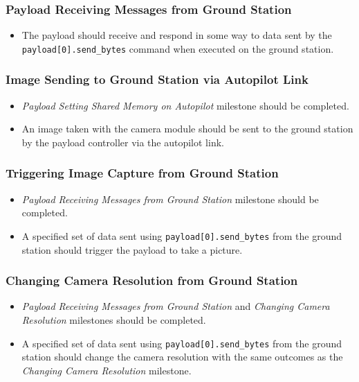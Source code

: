 	\subsubsection{Payload Receiving Messages from Ground Station}
		\begin{itemize}
			\item 	The payload should receive and respond in some way to 
				data sent by the \verb+payload[0].send_bytes+ command
				when executed on the ground station.
		\end{itemize}

	\subsubsection{Image Sending to Ground Station via Autopilot Link}
		\begin{itemize}
			\item 	\emph{Payload Setting Shared Memory on Autopilot} milestone
				should be completed.
			\item 	An image taken with the camera module should be sent to the
				ground station by the payload controller via the autopilot link.
		\end{itemize}


	\subsubsection{Triggering Image Capture from Ground Station}
		\begin{itemize}
			\item 	\emph{Payload Receiving Messages from Ground Station} milestone
				should be completed.
			\item 	A specified set of data sent using \verb+payload[0].send_bytes+
				from the ground station should trigger the payload to take a picture.
		\end{itemize}

	\subsubsection{Changing Camera Resolution from Ground Station}
		\begin{itemize}
			\item 	\emph{Payload Receiving Messages from Ground Station} and 
				\emph{Changing Camera Resolution} milestones should be completed.
			\item 	A specified set of data sent using \verb+payload[0].send_bytes+
				from the ground station should change the camera resolution with 
				the same outcomes as the \emph{Changing Camera Resolution} milestone.
		\end{itemize}


